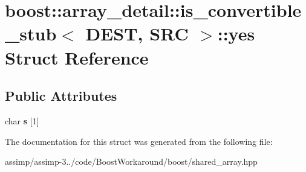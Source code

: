 \hypertarget{structboost_1_1array__detail_1_1is__convertible__stub_1_1yes}{\section{boost\+:\+:array\+\_\+detail\+:\+:is\+\_\+convertible\+\_\+stub$<$ D\+E\+S\+T, S\+R\+C $>$\+:\+:yes Struct Reference}
\label{structboost_1_1array__detail_1_1is__convertible__stub_1_1yes}
}
\subsection*{Public Attributes}
\begin{DoxyCompactItemize}
\item 
\hypertarget{structboost_1_1array__detail_1_1is__convertible__stub_1_1yes_a4ab147ba928379a85906eecee39acd08}{char {\bfseries s} \mbox{[}1\mbox{]}}\label{structboost_1_1array__detail_1_1is__convertible__stub_1_1yes_a4ab147ba928379a85906eecee39acd08}

\end{DoxyCompactItemize}


The documentation for this struct was generated from the following file\+:\begin{DoxyCompactItemize}
\item 
assimp/assimp-\/3../code/\+Boost\+Workaround/boost/shared\+\_\+array.\+hpp\end{DoxyCompactItemize}

